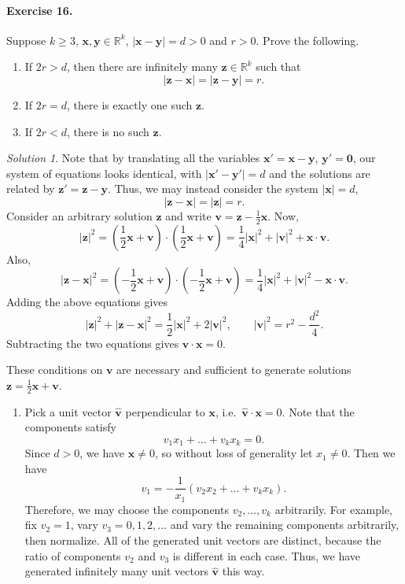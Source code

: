 \documentclass[11pt]{report}
\def\R{\mathbb{R}}
\renewcommand\vec\boldsymbol
\def\vx{\vec{x}}
\def\vy{\vec{y}}
\def\vz{\vec{z}}
\theoremstyle{remark}
\newtheorem*{solution}{Solution}
\begin{document}
    \paragraph{Exercise 16.} Suppose $k \geq 3$, $\vx, \vy \in \R^k$,
    $|\vx - \vy| = d > 0$ and $r > 0$. Prove the following.
    \begin{enumerate}
        \itemsep0em
        \item If $2r > d$, then there are infinitely many $\vz \in \R^k$ such
        that \[
            |\vz - \vx| = |\vz - \vy| = r.
        \] 
        \item If $2r = d$, there is exactly one such $\vz$.
        \item If $2r < d$, there is no such $\vz$.
    \end{enumerate}
    \begin{solution}
        Note that by translating all the variables $\vx' = \vx - \vy$,
        $\vy' = \vec{0}$, our system of equations looks identical, with $|\vx' -
        \vy'| = d$ and the solutions are related by $\vz' = \vz -
        \vy$. Thus, we may instead consider the system $|\vx| = d$, \[
            |\vz - \vx| = |\vz| = r.
        \]
        Consider an arbitrary solution $\vz$ and write $\vec{v} = \vz - 
        \frac{1}{2}\vx$. Now, \[
            |\vz|^2 = (\frac{1}{2}\vx + \vec{v})\cdot
            (\frac{1}{2}\vx + \vec{v}) = \frac{1}{4}|\vx|^2 +
            |\vec{v}|^2 + \vx\cdot\vec{v}.
        \] Also, \[
            |\vz - \vx|^2 = 
            (-\frac{1}{2}\vx+\vec{v})\cdot(-\frac{1}{2}\vx+\vec{v}) =
            \frac{1}{4}|\vx|^2 + |\vec{v}|^2 - \vx\cdot\vec{v}. 
        \] Adding the above equations gives \[
            |\vz|^2 + |\vz - \vx|^2 = \frac{1}{2}|\vx|^2 +
            2|\vec{v}|^2, \qquad
            |\vec{v}|^2 = r^2 - \frac{d^2}{4}.
        \] Subtracting the two equations gives $\vec{v}\cdot\vx = 0$.

        These conditions on $\vec{v}$ are necessary and sufficient to generate
        solutions $\vz = \frac{1}{2}\vx + \vec{v}$.

        \begin{enumerate}
            \item Pick a unit vector $\hat{\vec{v}}$ perpendicular to $\vx$,
            i.e.\ $\hat{\vec{v}}\cdot\vx = 0$. Note that the components satisfy
            \[
                v_1x_1 + \dots + v_kx_k = 0.
            \] Since $d > 0$, we have $\vx\neq 0$, so without loss of generality
            let $x_1 \neq 0$. Then we have \[
                v_1 = -\frac{1}{x_1}(v_2x_2 + \dots + v_kx_k).
            \] Therefore, we may choose the components $v_2, \dots, v_k$
            arbitrarily.  For example, fix $v_2 = 1$, vary $v_3 = 0, 1, 2, \dots$
            and vary the remaining components arbitrarily, then normalize. All of
            the generated unit vectors are distinct, because the ratio of components
            $v_2$ and $v_3$ is different in each case. Thus, we have generated
            infinitely many unit vectors $\hat{\vec{v}}$ this way.


\end{enumerate}
\end{solution}
\end{document}
